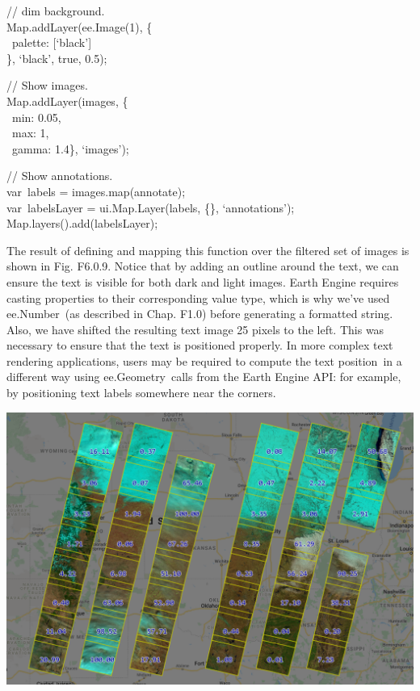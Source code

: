 \documentclass[
  letterpaper,
  DIV=11,
  numbers=noendperiod]{scrreprt}
\begin{document}
// dim background.\\
Map.addLayer(ee.Image(1), \{\\
\hspace*{0.333em} ~palette: {[}`black'{]}\\
\}, `black', true, 0.5);

// Show images.\\
Map.addLayer(images, \{\\
\hspace*{0.333em} ~min: 0.05,\\
\hspace*{0.333em} ~max: 1,\\
\hspace*{0.333em} ~gamma: 1.4\}, `images');

// Show annotations.\\
var~labels = images.map(annotate);\\
var~labelsLayer = ui.Map.Layer(labels, \{\}, `annotations');\\
Map.layers().add(labelsLayer);

The result of defining and mapping this function over the filtered set
of images is shown in Fig. F6.0.9. Notice that by adding an outline
around the text, we can ensure the text is visible for both dark and
light images. Earth Engine requires casting properties to their
corresponding value type, which is why we've used ee.Number~(as
described in Chap. F1.0) before generating a formatted string. Also, we
have shifted the resulting text image 25 pixels to the left. This was
necessary to ensure that the text is positioned properly. In more
complex text rendering applications, users may be required to compute
the text position~in a different way using ee.Geometry~calls from the
Earth Engine API: for example, by positioning text labels somewhere near
the corners.

\includegraphics{./F6/image3.png}
\end{document}
